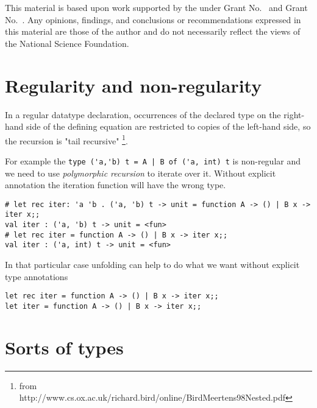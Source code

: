 \documentclass[acmsmall,review,anonymous]{acmart}\settopmatter{printfolios=true,printccs=false,printacmref=false}
\begin{document}


\begin{acks}                            %
  This material is based upon work supported by the
   under Grant
  No.~ and Grant
  No.~.  Any opinions, findings, and
  conclusions or recommendations expressed in this material are those
  of the author and do not necessarily reflect the views of the
  National Science Foundation.
\end{acks}

\section{Regularity and non-regularity}
In a regular datatype declaration, occurrences of the declared type on the right-hand
side  of  the  defining  equation  are  restricted  to  copies  of  the  left-hand  side,  so
the recursion  is "tail recursive"
\footnote{from http://www.cs.ox.ac.uk/richard.bird/online/BirdMeertens98Nested.pdf}.

For example the \lstinline{type ('a,'b) t = A | B of ('a, int) t} is non-regular and we need to use
\textit{polymorphic recursion} to iterate over it. Without explicit annotation the iteration
function will have the wrong type.
\begin{lstlisting}
# let rec iter: 'a 'b . ('a, 'b) t -> unit = function A -> () | B x -> iter x;;
val iter : ('a, 'b) t -> unit = <fun>
# let rec iter = function A -> () | B x -> iter x;;
val iter : ('a, int) t -> unit = <fun>
\end{lstlisting}
In that particular case unfolding can help to do what we want without explicit type annotations
\begin{lstlisting}
let rec iter = function A -> () | B x -> iter x;;
let iter = function A -> () | B x -> iter x;;
\end{lstlisting}

\section{Sorts of types}
% 
\end{document}
